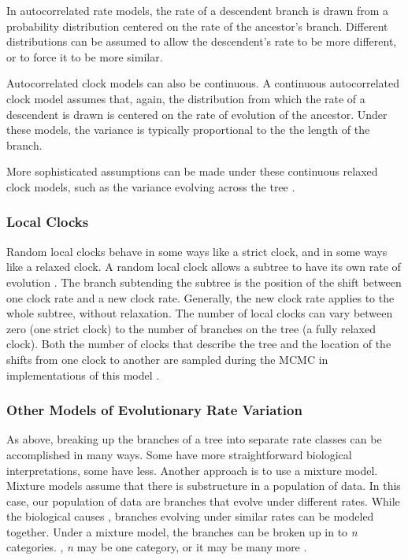 In autocorrelated rate models, the rate of a descendent branch is drawn from a probability distribution \citep{Aris-Brosou2002} centered on the rate of the ancestor's branch. 
Different distributions can be assumed to allow the descendent's rate to be more different, or to force it to be more similar. 


Autocorrelated clock models can also be continuous.
A continuous autocorrelated clock model assumes that, again, the distribution from which the rate of a descendent is drawn is centered on the rate of evolution of the ancestor.
Under these models,  the variance is typically proportional to the the length of the branch.

More sophisticated assumptions can be made under these continuous  relaxed clock models, such as the variance evolving across the tree \citep{Thorne1998, Kishino2001, Thorne2002, Aris-Brosou2002, Aris-Brosou2003}.

\subsubsection{Local Clocks}

Random local clocks behave in some ways like a strict clock, and in some ways like a relaxed clock. 
A random local clock allows a subtree to have its own rate of evolution \citep{yoder2000}. 
The branch subtending the subtree is the position of the shift between one clock rate and a new clock rate. 
Generally, the new clock rate applies to the whole subtree, without relaxation.
The number of local clocks can vary between zero (one strict clock) to the number of branches on the tree (a fully relaxed clock).
Both the number of clocks that describe the tree and the location of the shifts from one clock to another are sampled during the MCMC in implementations of this model \citep{Drummond2010}. 


\subsubsection{Other Models of Evolutionary Rate Variation}

As  above, breaking up the branches of a tree into separate rate classes can be accomplished in many ways.
Some have more straightforward biological interpretations, some have less. 
Another approach is to use a mixture model.
Mixture models assume that there is substructure in a population of data.
In this case, our population of data are branches that evolve under different rates.
While the biological causes , branches evolving under similar rates can be modeled together. 
Under a mixture model, the branches can be broken up in to \textit{n} categories.
, \textit{n} may be one category, or it may be many more .

